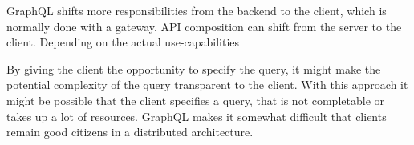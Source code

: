\bigskip

\noindent GraphQL shifts more responsibilities from the backend to the client, which is normally done with a gateway. API composition can shift from the server to the client. Depending on the actual use-capabilities

\bigskip

\noindent By giving the client the opportunity to specify the query, it might make the potential complexity of the query transparent to the client. With this approach it might be possible that the client specifies a query, that is not completable or takes up a lot of resources. GraphQL makes it somewhat difficult that clients remain good citizens in a distributed architecture. \cite{book:2018:richardson:background:bff:microservices-patterns}





